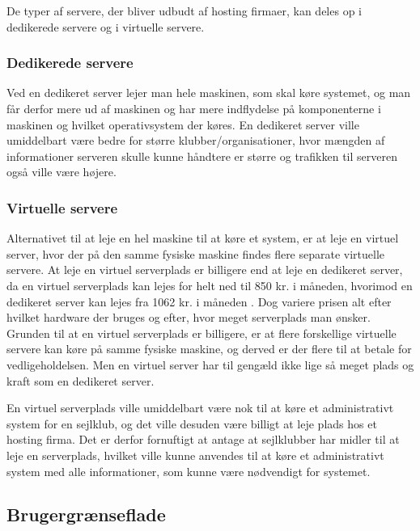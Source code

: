 De typer af servere, der bliver udbudt af hosting firmaer, kan deles op i dedikerede servere og i virtuelle
servere.


\subsubsection{Dedikerede servere}

Ved en dedikeret server lejer man hele maskinen, som skal køre systemet, og man får derfor mere ud af maskinen
og har mere indflydelse på komponenterne i maskinen og hvilket operativsystem der køres. En dedikeret server
ville umiddelbart være bedre for større klubber/organisationer, hvor mængden af informationer serveren skulle
kunne håndtere er større og trafikken til serveren også ville være højere. \citep{Dedikeretserver}


\subsubsection{Virtuelle servere}

Alternativet til at leje en hel maskine til at køre et system, er at leje en virtuel server, hvor der på den
samme fysiske maskine findes flere separate virtuelle servere. At leje en virtuel serverplads er billigere end
at leje en dedikeret server, da en virtuel serverplads kan lejes for helt ned til 850 kr. i
måneden\citep{Virtuelserver}, hvorimod en dedikeret server kan lejes fra 1062 kr. i måneden
\citep{Dedikeretserver}. 
Dog variere prisen alt efter hvilket hardware der bruges og efter, hvor meget
serverplads man ønsker. Grunden til at en virtuel serverplads er billigere, er at flere forskellige virtuelle
servere kan køre på samme fysiske maskine, og derved er der flere til at betale for vedligeholdelsen. Men en
virtuel server har til gengæld ikke lige så meget plads og kraft som en dedikeret server.

En virtuel serverplads ville umiddelbart være nok til at køre et administrativt system for en sejlklub, og det
ville desuden være billigt at leje plads hos et hosting firma. Det er derfor fornuftigt at antage at
sejlklubber har midler til at leje en serverplads, hvilket ville kunne anvendes til at køre et administrativt
system med alle informationer, som kunne være nødvendigt for systemet.


\subsection{Brugergrænseflade}

